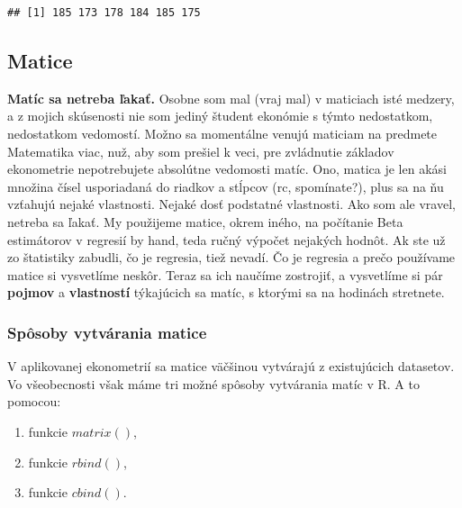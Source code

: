 \begin{Shaded}
\begin{Highlighting}[]
\StringTok{ }\NormalTok{vyska[vyska }\OperatorTok{>}\StringTok{ }\NormalTok{]}

\end{Highlighting}
\end{Shaded}

\begin{verbatim}
## [1] 185 173 178 184 185 175
\end{verbatim}

\hypertarget{matice}{%
\subsection{Matice}\label{matice}}

\textbf{Matíc sa netreba ľakať.} Osobne som mal (vraj mal) v maticiach
isté medzery, a z mojich skúsenosti nie som jediný študent ekonómie s
týmto nedostatkom, nedostatkom vedomostí. Možno sa momentálne venujú
maticiam na predmete Matematika viac, nuž, aby som prešiel k veci, pre
zvládnutie základov ekonometrie nepotrebujete absolútne vedomosti matíc.
Ono, matica je len akási množina čísel usporiadaná do riadkov a stĺpcov
(rc, spomínate?), plus sa na ňu vzťahujú nejaké vlastnosti. Nejaké dosť
podstatné vlastnosti. Ako som ale vravel, netreba sa ľakať. My použijeme
matice, okrem iného, na počítanie Beta estimátorov v regresií by hand,
teda ručný výpočet nejakých hodnôt. Ak ste už zo štatistiky zabudli, čo
je regresia, tiež nevadí. Čo je regresia a prečo používame matice si
vysvetlíme neskôr. Teraz sa ich naučíme zostrojiť, a vysvetlíme si pár
\textbf{pojmov} a \textbf{vlastností} týkajúcich sa matíc, s ktorými sa
na hodinách stretnete.

\hypertarget{spuxf4soby-vytvuxe1rania-matice}{%
\subsubsection{Spôsoby vytvárania
matice}\label{spuxf4soby-vytvuxe1rania-matice}}

V aplikovanej ekonometrií sa matice väčšinou vytvárajú z existujúcich
datasetov. Vo všeobecnosti však máme tri možné spôsoby vytvárania matíc
v R. A to pomocou:

\begin{enumerate}
\def\labelenumi{\arabic{enumi}.}
\tightlist
\item
  funkcie \(matrix()\),
\item
  funkcie \(rbind()\),
\item
  funkcie \(cbind()\).
\end{enumerate}


